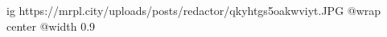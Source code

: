  
 
 
 
 

\ifcmt
  ig https://mrpl.city/uploads/posts/redactor/qkyhtgs5oakwviyt.JPG
  @wrap center
  @width 0.9
\fi
